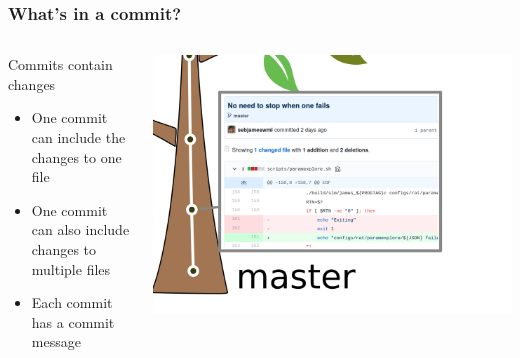 \documentclass{beamer}
\begin{document}
\begin{frame}
  \frametitle{What's in a commit?}
  \begin{columns}[T]
    \begin{column}{.4\textwidth}
      \begin{block}{Commits contain changes}
        \begin{itemize}
        \item One commit can include the changes to one file
        \item One commit can also include changes to multiple files
        \item Each commit has a \alert{commit message}
        \end{itemize}
      \end{block}
    \end{column}
    \begin{column}{.6\textwidth}
      \includegraphics[width=\textwidth]{tree_mastercommits_commitdetail.png}
    \end{column}
  \end{columns}
\end{frame}
\end{document}
